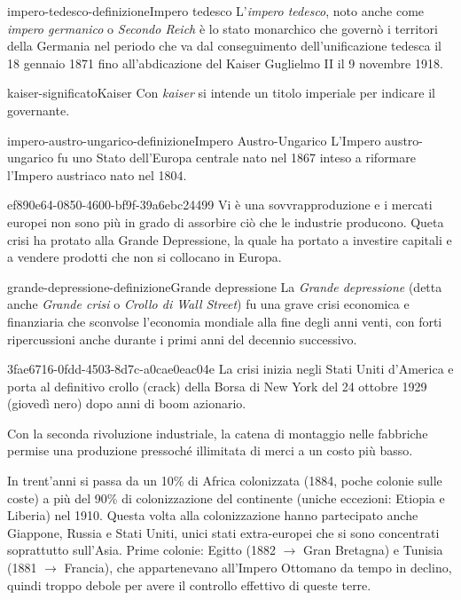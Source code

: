 \documentclass[preview]{standalone}
\begin{document}
\begin{snippetdefinition}{impero-tedesco-definizione}{Impero tedesco}
    L'\textit{impero tedesco}, noto anche come \textit{impero germanico}
    o \textit{Secondo Reich} è lo stato monarchico che governò i
    territori della Germania nel periodo che va dal conseguimento
    dell'unificazione tedesca il 18 gennaio 1871 fino all'abdicazione del
    Kaiser Guglielmo II il 9 novembre 1918. 
\end{snippetdefinition}

\begin{snippetnote}{kaiser-significato}{Kaiser}
    Con \textit{kaiser} si intende un titolo imperiale per indicare il governante.
\end{snippetnote}

\begin{snippetdefinition}{impero-austro-ungarico-definizione}{Impero Austro-Ungarico}
    L'Impero austro-ungarico fu uno Stato dell'Europa centrale nato nel 1867
    inteso a riformare l'Impero austriaco nato nel 1804.
\end{snippetdefinition}

\begin{snippet}{ef890e64-0850-4600-bf9f-39a6ebc24499}
    Vi è una sovvrapproduzione e i mercati europei non sono più in grado di assorbire ciò che le industrie producono.
    Queta crisi ha protato alla Grande Depressione, la quale ha portato a investire capitali 
    e a vendere prodotti che non si collocano in Europa.
\end{snippet}

\begin{snippetdefinition}{grande-depressione-definizione}{Grande depressione}
    La \textit{Grande depressione} (detta anche \textit{Grande crisi} o
    \textit{Crollo di Wall Street}) fu una grave crisi economica e finanziaria che
    sconvolse l'economia mondiale alla fine degli anni venti,
    con forti ripercussioni anche durante i primi anni del decennio successivo.
\end{snippetdefinition}

\begin{snippet}{3fae6716-0fdd-4503-8d7c-a0cae0eac04e}
    La crisi inizia negli Stati Uniti d'America e porta al definitivo crollo
    (crack) della Borsa di New York del 24 ottobre 1929 (giovedì nero) dopo anni di boom azionario. 
    
    Con la seconda rivoluzione industriale, la catena di montaggio nelle fabbriche
    permise una produzione pressoché illimitata di merci a un costo più basso.
    
    In trent'anni si passa da un 10\% di Africa colonizzata (1884, poche colonie sulle coste)
    a più del 90\% di
    colonizzazione del continente (uniche eccezioni: Etiopia e Liberia) nel 1910.
    Questa volta alla colonizzazione hanno partecipato anche Giappone, Russia e Stati Uniti, unici stati
    extra-europei che si sono concentrati soprattutto sull'Asia.
    Prime colonie: Egitto (1882 \(\rightarrow\) Gran Bretagna) e Tunisia (1881 \(\rightarrow\) Francia), che appartenevano
    all'Impero Ottomano da tempo in declino, quindi troppo debole per avere il controllo effettivo di
    queste terre.
\end{snippet}
\end{document}
